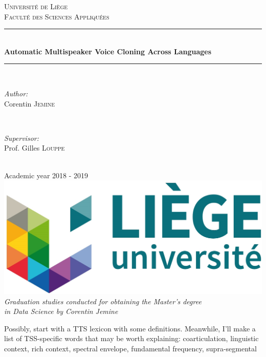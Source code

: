\documentclass[a4paper, oneside]{article}
\begin{document}
\begin{titlepage}
	\newcommand{\HRule}{\rule{\linewidth}{0.5mm}}
	\center
	\textsc{\LARGE Université de Liège}\\[1cm]
	\textsc{\Large Faculté des Sciences Appliquées}\\[2cm]
		
	\HRule \\[0.5cm]
	{ \huge \bfseries Automatic Multispeaker Voice Cloning Across Languages}\\[0.2cm]
	\HRule \\[3cm]

	\begin{minipage}{0.4\textwidth}
		\begin{flushleft} \Large
			\emph{Author:}\\
			Corentin \textsc{Jemine}
		\end{flushleft}
	\end{minipage}
	~
	\begin{minipage}{0.4\textwidth}
		\begin{flushright} \Large
			\emph{Supervisor:} \\
			Prof. Gilles \textsc{Louppe}
		\end{flushright}
	\end{minipage}\\[4cm]
	
	{\LARGE Academic year 2018 - 2019}\\[2cm]
	
	\includegraphics{images/uliege_logo.jpg}\\[1.25cm]
	
	\textit{Graduation studies conducted for obtaining the Master's degree \\in Data Science by Corentin Jemine}
	
	\vfill
\end{titlepage}

\setcounter{page}{2}

\color{red}
Possibly, start with a TTS lexicon with some definitions. Meanwhile, I'll make a list of TSS-specific words that may be worth explaining: coarticulation, linguistic context, rich context, spectral envelope, fundamental frequency, supra-segmental
\color{black}
\end{document}
